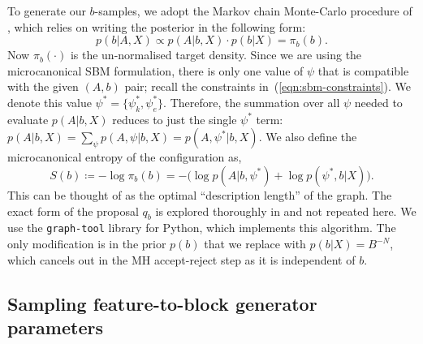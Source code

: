 To generate our $b$-samples, we adopt the Markov chain Monte-Carlo procedure of
\cite{Peixoto-MCMC},
which relies on writing the posterior in the following form:
%
\begin{equation}
	p(b | A, X) \propto p(A | b, X) \cdot p(b | X) = \pi_b(b).
\end{equation}
%
Now $\pi_b(\cdot)$ is the un-normalised target density.
Since we are using the microcanonical SBM formulation, there is only one 
value of $\psi$ that is compatible with the given $(A, b)$ pair;
recall the constraints in~(\ref{eqn:sbm-constraints}).
We denote this value $\psi^* = \{\psi_k^*, \psi_e^*\}$. Therefore, 
the summation over all $\psi$ needed to evaluate $p(A | b, X)$ reduces to just the single $\psi^*$ term:
$p(A | b, X) = \sum_{\psi} \nolimits p(A , \psi | b, X) = p(A, \psi^* | b, X)$.
We also define the microcanonical entropy of the configuration as,
%
\begin{equation}
	S(b) \coloneqq - \log \pi_b(b) = - \Big( \log p(A | b, \psi^*) + \log p(\psi^*, b | X) \Big).
	\label{eqn:dl-form}
\end{equation}
%
This can be thought of as the optimal
``description length'' of the graph. 
The exact form of the proposal $q_b$ is explored thoroughly in
\cite{Peixoto-MCMC} and not repeated here. We use the \verb*|graph-tool| \cite{peixoto_graph-tool_2014}
library for Python, which implements this algorithm.
The only modification is in 
the prior $p(b)$ that we replace with $p(b|X)=B^{-N}$, 
which cancels out in the MH accept-reject step as it is independent of $b$.

\subsection{Sampling feature-to-block generator parameters}
\label{s:sfb}

